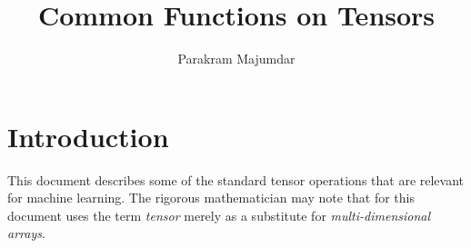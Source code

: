 \documentclass{article}
\title{Common Functions on Tensors}
\author{Parakram Majumdar}
\begin{document}
  \maketitle

\newcommand{\R}{\mathbb{R}}
\newcommand{\Prob}[2]{\mathbb{#1}\left[ #2 \right]}
\newenvironment{where}{\noindent{}where\begin{itemize}}{\end{itemize}}
  
\section{Introduction}
  This document describes some of the standard tensor operations
  that are relevant for machine learning.
  The rigorous mathematician may note 
  that for this document uses the term \emph{tensor}
  merely as a substitute for \emph{multi-dimensional arrays}.
  
\end{document}

